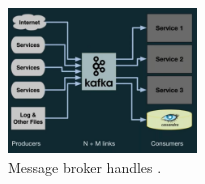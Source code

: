 \documentclass{article}
\begin{document}
\begin{figure}
	\centering
	\includegraphics[width=5cm]{after-kafka}
	\caption{Message broker handles  .}\label{fig:after-kafka}
\end{figure}







%
\end{document}
